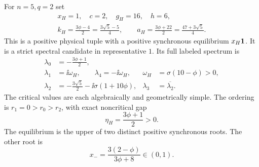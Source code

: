 \begin{theorem}
\label{thm:P11-five}
For $n=5,q=2$ set
\begin{equation}
 \begin{gathered}
 x_H=1,\quad c=2,\quad g_H=16,\quad h=6,\\
 k_H=\frac{3\phi-4}{2}=\frac{3\sqrt5-5}{4},\qquad
 a_H=\frac{3\phi+22}{2}=\frac{47+3\sqrt5}{4}.
 \end{gathered}
 \label{eq:P11-tuple}
\end{equation}
This is a positive physical tuple with a positive synchronous equilibrium
$x_H\mathbf{1}$. It is a strict spectral candidate in representative $1$.
Its full labeled spectrum is
\begin{align}
 \lambda_0&=-\frac{3\phi+1}{2},\label{eq:P11-five-spectrum}\\
 \lambda_1&=\ii\omega_H,\qquad \lambda_4=-\ii\omega_H,
       &\omega_H&=\sigma(10-\phi)>0,\nonumber\\
 \lambda_2&=-\frac{3\sqrt5}{2}-\ii\sigma(1+10\phi),
       &\lambda_3&=\overline{\lambda_2}.\nonumber
\end{align}
The critical values are each algebraically and geometrically simple.
The ordering is $r_1=0>r_0>r_2$, with exact noncritical gap
\begin{equation}
 \eta_H=\frac{3\phi+1}{2}>0.
 \label{eq:P11-five-gap}
\end{equation}
The equilibrium is the upper of two distinct positive synchronous roots.
The other root is
\begin{equation}
 x_- =\frac{3(2-\phi)}{3\phi+8}\in(0,1).
 \label{eq:P11-lower-root}
\end{equation}
\end{theorem}
